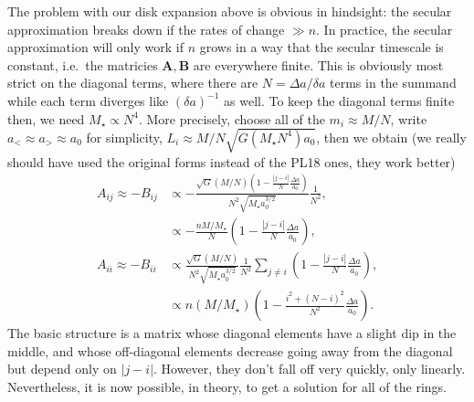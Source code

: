 \documentclass[11pt,
        usenames, %
        dvipsnames %
    ]{article}
\newcommand*{\bm}[1]{\boldsymbol{\mathbf{#1}}}
\newcommand*{\abs}[1]{\left|#1\right|}
\newcommand*{\p}[1]{\left(#1\right)}
\begin{document}
The problem with our disk expansion above is obvious in hindsight: the secular
approximation breaks down if the rates of change $\gg n$. In practice, the
secular approximation will only work if $n$ grows in a way that the secular
timescale is constant, i.e.\ the matricies $\bm{A}, \bm{B}$ are everywhere
finite. This is obviously most strict on the diagonal terms, where there are $N
= \Delta a / \delta a$ terms in the summand while each term diverges like
$(\delta a)^{-1}$ as well. To keep the diagonal terms finite then, we need
$M_{\star} \propto N^4$. More precisely, choose all of the $m_i
\approx M / N$, write $a_< \approx a_> \approx a_0$ for simplicity, $L_i \approx
M / N\sqrt{G\p{M_\star N^{4}}a_0}$, then we obtain (we really should have used
the original forms instead of the PL18 ones, they work better)
\begin{align}
    A_{ij} \approx -B_{ij} &\propto
        -\frac{\sqrt{G}\p{M/N} \p{1 - \frac{\abs{j - i}}{N}\frac{\Delta a}{a_0}}}
        {N^2\sqrt{M_\star a_0^{3/2}}} \frac{1}{N^2},\\
        &\propto -\frac{nM/M_\star}{N}
        \p{1 - \frac{\abs{j - i}}{N}\frac{\Delta a}{a_0}},\\
    A_{ii} \approx -B_{ii} &\propto \frac{\sqrt{G}\p{M/N}}{N^2\sqrt{M_\star
        a_0^{3/2}}} \frac{1}{N^2}
        \sum\limits_{j \neq i}\p{1 - \frac{\abs{j - i}}{N}\frac{\Delta a}{a_0}},\\
        &\propto n\p{M / M_\star}
        \p{1 - \frac{i^2 + (N - i)^2}{N^2}\frac{\Delta a}{a_0}}.
\end{align}
The basic structure is a matrix whose diagonal elements have a slight dip in the
middle, and whose off-diagonal elements decrease going away from the diagonal
but depend only on $\abs{j - i}$. However, they don't fall off very quickly,
only linearly. Nevertheless, it is now possible, in theory, to get a solution
for all of the rings.
\end{document}
